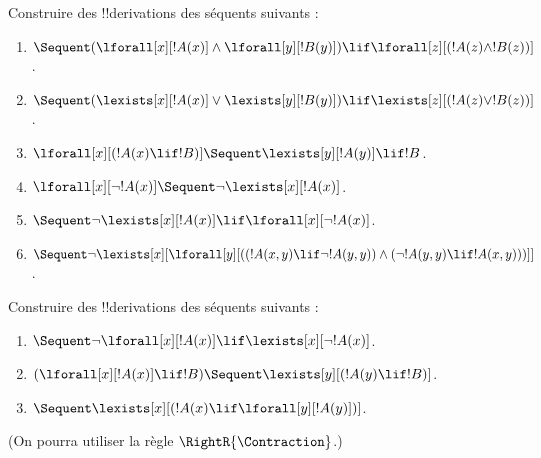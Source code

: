 \documentclass[../../../include/open-logic-section]{subfiles}
\begin{document}
\begin{prob}
Construire des !!{derivation}s des séquents suivants :
\begin{enumerate}
\item $\Sequent (\lforall[x][!A(x)] \land \lforall[y][!B(y)]) \lif
\lforall[z][(!A(z) \land !B(z))]$.
\item $\Sequent (\lexists[x][!A(x)] \lor \lexists[y][!B(y)]) \lif
\lexists[z][(!A(z) \lor !B(z))]$.
\item $\lforall[x][(!A(x) \lif !B)] \Sequent \lexists[y][!A(y)] \lif !B$.
\item $\lforall[x][\lnot !A(x)] \Sequent \lnot\lexists[x][!A(x)]$.
\item $\Sequent \lnot\lexists[x][!A(x)] \lif \lforall[x][\lnot !A(x)]$.
\item $\Sequent \lnot\lexists[x][\lforall[y][((!A(x,y) \lif \lnot
!A(y,y)) \land (\lnot !A(y,y) \lif !A(x,y)))]]$.
\end{enumerate}
\end{prob}

\begin{prob}
Construire des !!{derivation}s des séquents suivants :
\begin{enumerate}
\item $\Sequent \lnot\lforall[x][!A(x)] \lif \lexists[x][\lnot!A(x)]$.
\item $(\lforall[x][!A(x)] \lif !B) \Sequent \lexists[y][(!A(y) \lif !B)]$.
\item $\Sequent \lexists[x][(!A(x) \lif \lforall[y][!A(y)])]$.
\end{enumerate}
(On pourra utiliser la règle $\RightR{\Contraction}$.)
\end{prob}
\end{document}
